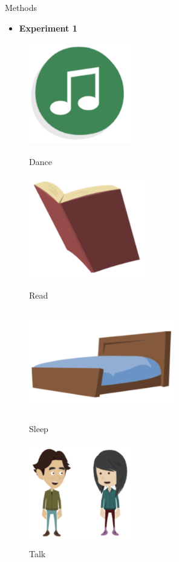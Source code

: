 \documentclass[final]{beamer}
\newlength{\colwidth}
\begin{document}
\begin{frame}[t]
\begin{columns}[t]
\begin{column}{\colwidth}
\begin{block}{Methods}
    \begin{itemize}
      \item \textbf{Experiment 1}
    \end{itemize}
    \begin{figure}
      \begin{minipage}[t]{0.2\linewidth}
        \centering
        \includegraphics[width=1.75in, height=1.75in]{figures/dance.png}
        \caption{Dance}
      \end{minipage}
      \begin{minipage}[t]{0.2\linewidth}
        \centering
        \includegraphics[width=2in, height=1.75in]{figures/read.png}
        \caption{Read}
      \end{minipage}%
      \begin{minipage}[t]{0.2\linewidth}
        \centering
        \includegraphics[width=2.5in, height=1.75in]{figures/sleep.png}
        \caption{Sleep}
      \end{minipage}
      \begin{minipage}[t]{0.2\linewidth}
        \centering
        \includegraphics[width=1.75in, height=1.75in]{figures/talk.png}
        \caption{Talk}
      \end{minipage}
    \end{figure}    


\end{block}
\end{column}
\end{columns}
\end{frame}
\end{document}

